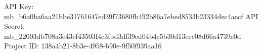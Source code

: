 API Key: mb_b6a0ba6aa21bbe31761647ed39f73680fb492b86a7ebed8533b23334dec4aecf
API Secret: mb_22003db708a3e43cf43503f4c3fbd3df39cd04b4c5b30d13ccc08d66a4739e0d
Project ID: 138a4b21-8b3e-4958-b90e-9f50f939aa16
